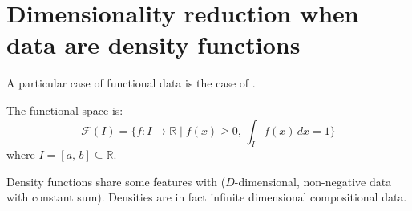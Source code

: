 %
\section{Dimensionality reduction when data are density functions}

A particular case of functional data is the case of .

The functional space is:
\begin{equation*}
    \mathcal F(I) = \{
        f : I \to \mathds R \mid f(x) \geq 0,\, \int_I f(x) \,dx = 1
    \}
\end{equation*}
where $I = [a,\,b] \subseteq \mathds R$.

Density functions share some features with 
($D$-dimensional, non-negative data with constant sum).
Densities are in fact infinite dimensional compositional data.

